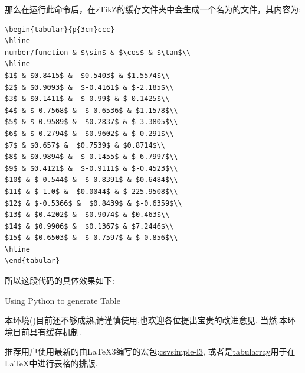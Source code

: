 那么在运行此命令后，在zTikZ的缓存文件夹中会生成一个名为的文件，其内容为:
\begin{verbatim}
\begin{tabular}{p{3cm}ccc}
\hline
number/function & $\sin$ & $\cos$ & $\tan$\\
\hline
$1$ & $0.8415$ &  $0.5403$ & $1.5574$\\
$2$ & $0.9093$ &  $-0.4161$ & $-2.185$\\
$3$ & $0.1411$ &  $-0.99$ & $-0.1425$\\
$4$ & $-0.7568$ &  $-0.6536$ & $1.1578$\\
$5$ & $-0.9589$ &  $0.2837$ & $-3.3805$\\
$6$ & $-0.2794$ &  $0.9602$ & $-0.291$\\
$7$ & $0.657$ &  $0.7539$ & $0.8714$\\
$8$ & $0.9894$ &  $-0.1455$ & $-6.7997$\\
$9$ & $0.4121$ &  $-0.9111$ & $-0.4523$\\
$10$ & $-0.544$ &  $-0.8391$ & $0.6484$\\
$11$ & $-1.0$ &  $0.0044$ & $-225.9508$\\
$12$ & $-0.5366$ &  $0.8439$ & $-0.6359$\\
$13$ & $0.4202$ &  $0.9074$ & $0.463$\\
$14$ & $0.9906$ &  $0.1367$ & $7.2446$\\
$15$ & $0.6503$ &  $-0.7597$ & $-0.856$\\
\hline
\end{tabular}
\end{verbatim}

所以这段代码的具体效果如下:
\begin{table}[H]
    \centering
    
    \caption{Using Python to generate Table}
\end{table}

\begin{remark}
    本环境()目前还不够成熟,请谨慎使用,也欢迎各位提出宝贵的改进意见. 
    当然,本环境目前具有缓存机制.
\end{remark}

\begin{remark}
    推荐用户使用最新的由\LaTeX3编写的宏包:\href{https://mirror-hk.koddos.net/CTAN/macros/latex/contrib/csvsimple/csvsimple-l3.pdf}{csvsimple-l3},
    或者是\href{https://mirror-hk.koddos.net/CTAN/macros/latex/contrib/tabularray/tabularray.pdf}{tabularray}用于在\LaTeX{}中进行表格的排版.
\end{remark}

